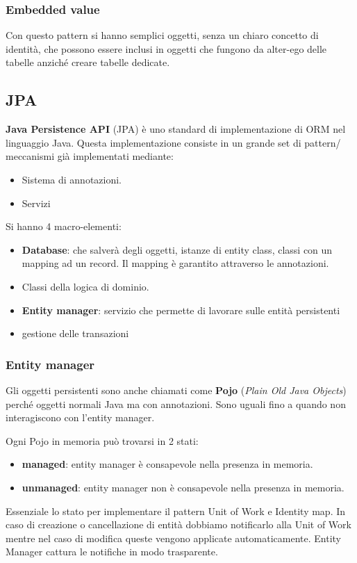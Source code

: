 \subsubsection{Embedded value}
Con questo pattern si hanno semplici oggetti, senza un chiaro concetto di
identità, che possono essere inclusi in oggetti che fungono da alter-ego delle
tabelle anziché creare tabelle dedicate.
\subsection{JPA}
\textbf{Java Persistence API} (JPA) è uno standard di implementazione di ORM nel
linguaggio Java. Questa implementazione consiste in un grande set di pattern/
meccanismi già implementati mediante:
\begin{itemize}
      \item Sistema di annotazioni.
      \item Servizi
\end{itemize}
Si hanno 4 macro-elementi:
\begin{itemize}
      \item \textbf{Database}: che salverà degli oggetti, istanze di entity class,
            classi con un mapping ad un record. Il mapping è garantito attraverso
            le annotazioni.
      \item Classi della logica di dominio.
      \item \textbf{Entity manager}: servizio che permette di lavorare sulle entità
            persistenti
      \item gestione delle transazioni
\end{itemize}
\subsubsection{Entity manager}
Gli oggetti persistenti sono anche chiamati come \textbf{Pojo} (\textit{Plain Old
      Java Objects}) perché oggetti normali Java ma con annotazioni. Sono uguali
fino a quando non interagiscono con l'entity manager.

Ogni Pojo in memoria può trovarsi in 2 stati:
\begin{itemize}
      \item \textbf{managed}: entity manager è consapevole nella presenza in
            memoria.
      \item \textbf{unmanaged}: entity manager non è consapevole nella presenza
            in memoria.
\end{itemize}
Essenziale lo stato per implementare il pattern Unit of Work e Identity map.
In caso di creazione o cancellazione di entità dobbiamo notificarlo alla Unit of
Work mentre nel caso di modifica queste vengono applicate automaticamente.
Entity Manager cattura le notifiche in modo trasparente.

